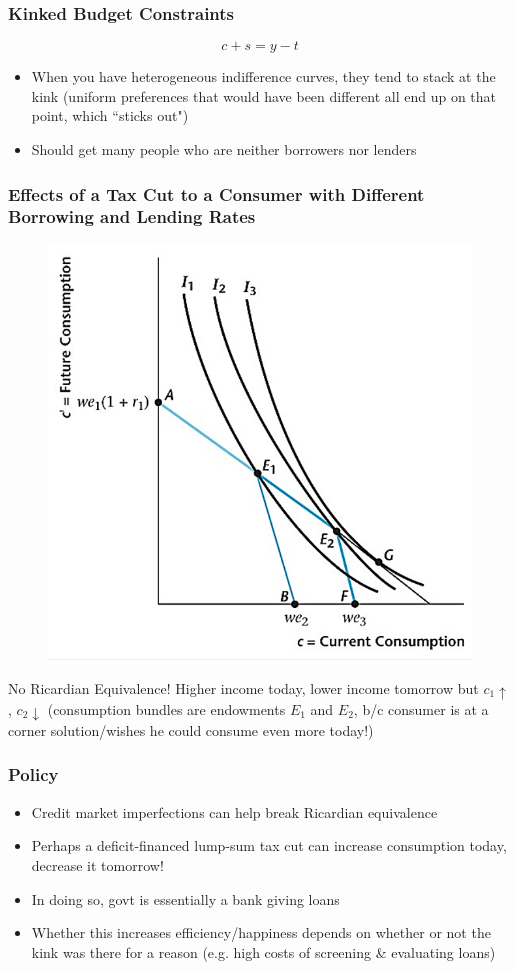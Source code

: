 \documentclass{beamer}
\begin{document}
\begin{frame}
\frametitle[alignment=center]{Kinked Budget Constraints}
$$c+s=y-t$$
\begin{itemize}
\item When you have heterogeneous indifference curves, they tend to stack at the kink (uniform preferences that would have been different all end up on that point, which ``sticks out")
\bigskip
\item Should get many people who are neither borrowers nor lenders
\end{itemize}
\end{frame}

\begin{frame}
\frametitle[alignment=center]{Effects of a Tax Cut to a Consumer with Different Borrowing and Lending Rates}
\begin{figure}
\centering
\includegraphics[scale=0.5]{Figures/W_Fig_10pt2.png}
\end{figure}
No Ricardian Equivalence!  Higher income today, lower income tomorrow but $c_1\uparrow$, $c_2\downarrow$ (consumption bundles are endowments $E_1$ and $E_2$, b/c consumer is at a corner solution/wishes he could consume even more today!)
\end{frame}

\begin{frame}
\frametitle[alignment=center]{Policy}
\begin{itemize}
\item Credit market imperfections can help break Ricardian equivalence
\bigskip
\item Perhaps a deficit-financed lump-sum tax cut can increase consumption today, decrease it tomorrow!
\bigskip
\item In doing so, govt is essentially a bank giving loans
\bigskip
\item Whether this increases efficiency/happiness depends on whether or not the kink was there for a reason (e.g. high costs of screening \& evaluating loans)
\end{itemize}
\end{frame}
\end{document}
